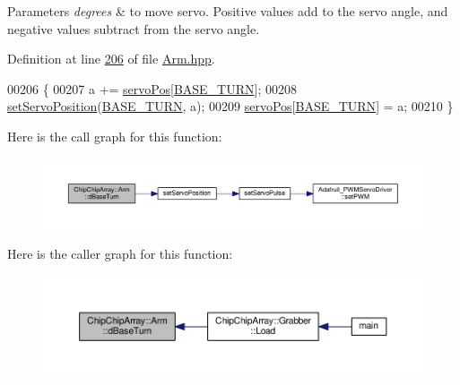 \begin{DoxyParams}{Parameters}
{\em degrees} & to move servo. Positive values add to the servo angle, and negative values subtract from the servo angle. \\
\hline
\end{DoxyParams}


Definition at line \hyperlink{Arm_8hpp_source_l00206}{206} of file \hyperlink{Arm_8hpp_source}{Arm.\+hpp}.


\begin{DoxyCode}
00206                                 \{
00207         a += \hyperlink{classChipChipArray_1_1Arm_a9ddcea9544b6e2a4315b9dd705df8fdd}{servoPos}[\hyperlink{Servo__Position__Shell_8h_af629c4ae98db77091b130c7fbc31cab2a87afce59ad3a309ba92f43778dde0edf}{BASE\_TURN}];
00208         \hyperlink{Servo__Position__Shell_8cpp_abd2cd3c2e36d42a2178a6f2fd12af905}{setServoPosition}(\hyperlink{Servo__Position__Shell_8h_af629c4ae98db77091b130c7fbc31cab2a87afce59ad3a309ba92f43778dde0edf}{BASE\_TURN}, a);
00209         \hyperlink{classChipChipArray_1_1Arm_a9ddcea9544b6e2a4315b9dd705df8fdd}{servoPos}[\hyperlink{Servo__Position__Shell_8h_af629c4ae98db77091b130c7fbc31cab2a87afce59ad3a309ba92f43778dde0edf}{BASE\_TURN}] = a;
00210     \}
\end{DoxyCode}


Here is the call graph for this function\+:
\nopagebreak
\begin{figure}[H]
\begin{center}
\leavevmode
\includegraphics[width=350pt]{classChipChipArray_1_1Arm_a980f5bd278cbe06aa21754fb8e0324b3_cgraph}
\end{center}
\end{figure}




Here is the caller graph for this function\+:
\nopagebreak
\begin{figure}[H]
\begin{center}
\leavevmode
\includegraphics[width=350pt]{classChipChipArray_1_1Arm_a980f5bd278cbe06aa21754fb8e0324b3_icgraph}
\end{center}
\end{figure}


